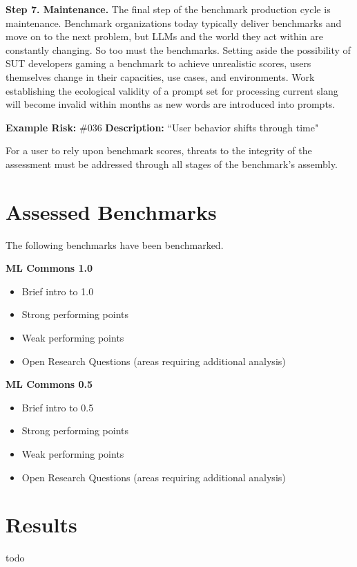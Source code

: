 \documentclass{article}
\begin{document}
{\bf Step 7. Maintenance.} The final step of the benchmark production cycle is maintenance. Benchmark organizations today typically deliver benchmarks and move on to the next problem, but LLMs and the world they act within are constantly changing. So too must the benchmarks. Setting aside the possibility of SUT developers gaming a benchmark to achieve unrealistic scores, users themselves change in their capacities, use cases, and environments. Work establishing the ecological validity of a prompt set for processing current slang will become invalid within months as new words are introduced into prompts.

\begin{center}
    \begin{tcolorbox}[colback=gray!10, colframe=black!50, width=\textwidth, boxrule=0.5mm, sharp corners, coltext=black]
        {\bf Example Risk:} \#036
        \newline
        {\bf Description:} ``User behavior shifts through time"
    \end{tcolorbox}
\end{center}

For a user to rely upon benchmark scores, threats to the integrity of the assessment must be addressed through all stages of the benchmark's assembly.
\section{Assessed Benchmarks}
The following benchmarks have been benchmarked.

{\bf ML Commons 1.0}
\begin{itemize}
\item Brief intro to 1.0
\item Strong performing points
\item Weak performing points
\item Open Research Questions (areas requiring additional analysis)
\end{itemize}

{\bf ML Commons 0.5}
\begin{itemize}
\item Brief intro to 0.5
\item Strong performing points
\item Weak performing points
\item Open Research Questions (areas requiring additional analysis)
\end{itemize}

\section{Results}
todo
\end{document}
